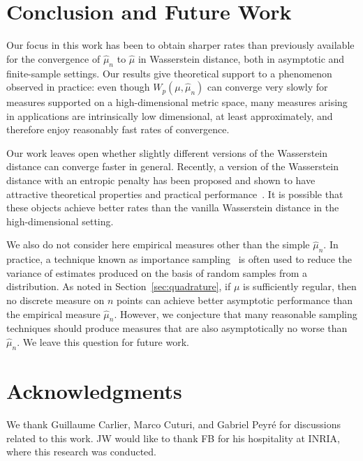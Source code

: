 \documentclass[sts]{imsart}
\begin{document}
\section{Conclusion and Future Work}
Our focus in this work has been to obtain sharper rates than previously available for the convergence of $\hat \mu_n$ to $\hat \mu$ in Wasserstein distance, both in asymptotic and finite-sample settings.
Our results give theoretical support to a phenomenon observed in practice: even though $W_p(\mu, \hat \mu_n)$ can converge very slowly for measures supported on a high-dimensional metric space, many measures arising in applications are intrinsically low dimensional, at least approximately, and therefore enjoy reasonably fast rates of convergence.

Our work leaves open whether slightly different versions of the Wasserstein distance can converge faster in general.
Recently, a version of the Wasserstein distance with an entropic penalty has been proposed and shown to have attractive theoretical properties and practical performance~\cite{SolGoeCut15,Cut13,CarDuvPeySch17,RolCutPey16}.
It is possible that these objects achieve better rates than the vanilla Wasserstein distance in the high-dimensional setting.

We also do not consider here empirical measures other than the simple $\hat \mu_n$.
In practice, a technique known as importance sampling~\cite{Buc13} is often used to reduce the variance of estimates produced on the basis of random samples from a distribution.
As noted in Section~\ref{sec:quadrature}, if $\mu$ is sufficiently regular, then no discrete measure on $n$ points can achieve better asymptotic performance than the empirical measure $\hat \mu_n$.
However, we conjecture that many reasonable sampling techniques should produce measures that are also asymptotically no worse than $\hat \mu_n$.
We leave this question for future work.



\section{Acknowledgments}

We thank Guillaume Carlier, Marco Cuturi, and Gabriel Peyr\'e for discussions related to this work.
JW would like to thank FB for his hospitality at INRIA, where this research was conducted.
\end{document}

